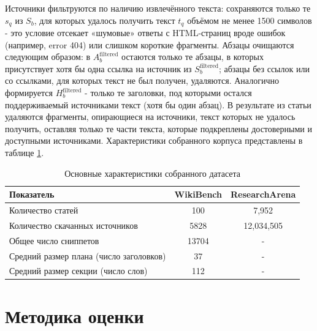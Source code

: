 \documentclass{article}
\theoremstyle{definition}
\theoremstyle{plain}
\begin{document}
Источники фильтруются по наличию извлечённого текста: сохраняются только те \(s_q\) из \(S_b\), для которых удалось получить текст \(t_q\) объёмом не менее 1500 символов - 
это условие отсекает «шумовые» ответы с HTML-страниц вроде ошибок (например, error 404) или слишком короткие фрагменты. 
Абзацы очищаются следующим образом: в \(A_b^{\mathrm{filtered}}\) остаются только те абзацы, в которых присутствует хотя бы одна ссылка на источник из \(S_b^{\mathrm{filtered}}\); 
абзацы без ссылок или со ссылками, для которых текст не был получен, удаляются. 
Аналогично формируется \(H_b^{\mathrm{filtered}}\) - только те заголовки, под которыми остался поддерживаемый источниками текст (хотя бы один абзац).
В результате из статьи удаляются фрагменты, опирающиеся на источники, текст которых не удалось получить, оставляя только те части текста,
которые подкреплены достоверными и доступными источниками. Характеристики собранного корпуса представлены в таблице \ref{tab:dataset}.

\begin{table}[ht!]
  \centering
  \caption{Основные характеристики собранного датасета}
  \label{tab:dataset}
  \begin{tabular}{lcc}
    \hline
    \textbf{Показатель} & \textbf{WikiBench} & \textbf{ResearchArena} \\
    \hline
    Количество статей                             & 100 & 7,952\\
    \hline
    Количество скачанных источников               & 5828 & 12,034,505\\
    \hline
    Общее число сниппетов                         & 13704 & -\\
    \hline
    Средний размер плана (число заголовков)       & 37 & -\\
    \hline
    Средний размер секции (число слов)            & 112 & -\\
    \hline
  \end{tabular}
\end{table}

\section*{Методика оценки}
\end{document}
